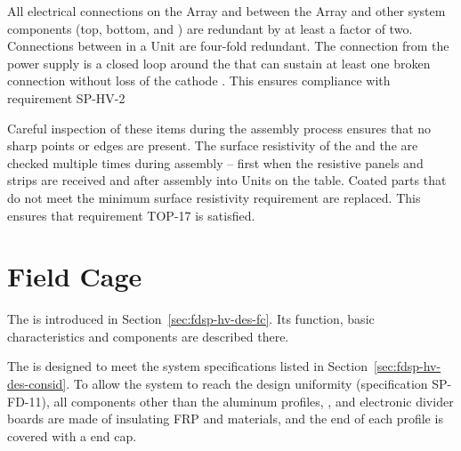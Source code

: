 All electrical connections on the  Array and between the  Array and other  system components (top, bottom, and ) are redundant by at least a factor of two.  Connections between  in a  Unit are four-fold redundant.  The  connection from the  power supply is a closed loop around the  that can sustain at least one broken connection without loss of the cathode .  This ensures compliance with requirement SP-HV-2

Careful inspection of these items during the assembly process ensures that no sharp points or edges are present. The surface resistivity of the   and the  are checked multiple times during assembly -- first when the resistive panels and strips are received and after assembly into  Units on the table.  Coated parts that do not meet the minimum surface resistivity requirement are replaced.  This ensures that requirement TOP-17 is satisfied. 



\section{Field Cage}


The  is introduced in Section~\ref{sec:fdsp-hv-des-fc}. Its function, basic characteristics and components are described there. 

The  %
is designed to %
meet the system specifications listed in Section~\ref{sec:fdsp-hv-des-consid}. %
To allow the system to reach the design  \efield{} uniformity 
(specification SP-FD-11), 
all components other than the aluminum profiles, , and electronic divider boards are made of insulating FRP and \frfour materials, and the end of each profile is covered with a  end cap. \\


